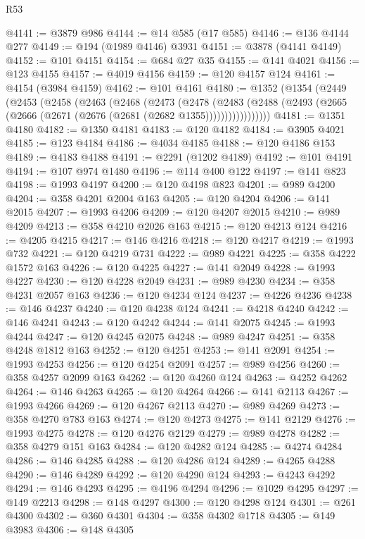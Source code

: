 \begin{lexlean}{R53}
\begin{coremodule}
@4141 := @3879 @986
@4144 := @14 @585 (@17 @585)
@4146 := @136 @4144 @277
@4149 := @194 (@1989 @4146) @3931
@4151 := @3878 (@4141 @4149)
@4152 := @101 @4151
@4154 := @684 @27 @35
@4155 := @141 @4021
@4156 := @123 @4155
@4157 := @4019 @4156
@4159 := @120 @4157 @124
@4161 := @4154 (@3984 @4159)
@4162 := @101 @4161
@4180 := @1352
    (@1354
      (@2449
        (@2453
          (@2458
            (@2463
              (@2468
                (@2473
                  (@2478
                    (@2483
                      (@2488 (@2493 (@2665 (@2666 (@2671 (@2676 (@2681 (@2682 @1355)))))))))))))))))
@4181 := @1351 @4180
@4182 := @1350 @4181
@4183 := @120 @4182
@4184 := @3905 @4021
@4185 := @123 @4184
@4186 := @4034 @4185
@4188 := @120 @4186 @153
@4189 := @4183 @4188
@4191 := @2291 (@1202 @4189)
@4192 := @101 @4191
@4194 := @107 @974 @1480
@4196 := @114 @400 @122
@4197 := @141 @823
@4198 := @1993 @4197
@4200 := @120 @4198 @823
@4201 := @989 @4200
@4204 := @358 @4201 @2004 @163
@4205 := @120 @4204
@4206 := @141 @2015
@4207 := @1993 @4206
@4209 := @120 @4207 @2015
@4210 := @989 @4209
@4213 := @358 @4210 @2026 @163
@4215 := @120 @4213 @124
@4216 := @4205 @4215
@4217 := @146 @4216
@4218 := @120 @4217
@4219 := @1993 @732
@4221 := @120 @4219 @731
@4222 := @989 @4221
@4225 := @358 @4222 @1572 @163
@4226 := @120 @4225
@4227 := @141 @2049
@4228 := @1993 @4227
@4230 := @120 @4228 @2049
@4231 := @989 @4230
@4234 := @358 @4231 @2057 @163
@4236 := @120 @4234 @124
@4237 := @4226 @4236
@4238 := @146 @4237
@4240 := @120 @4238 @124
@4241 := @4218 @4240
@4242 := @146 @4241
@4243 := @120 @4242
@4244 := @141 @2075
@4245 := @1993 @4244
@4247 := @120 @4245 @2075
@4248 := @989 @4247
@4251 := @358 @4248 @1812 @163
@4252 := @120 @4251
@4253 := @141 @2091
@4254 := @1993 @4253
@4256 := @120 @4254 @2091
@4257 := @989 @4256
@4260 := @358 @4257 @2099 @163
@4262 := @120 @4260 @124
@4263 := @4252 @4262
@4264 := @146 @4263
@4265 := @120 @4264
@4266 := @141 @2113
@4267 := @1993 @4266
@4269 := @120 @4267 @2113
@4270 := @989 @4269
@4273 := @358 @4270 @783 @163
@4274 := @120 @4273
@4275 := @141 @2129
@4276 := @1993 @4275
@4278 := @120 @4276 @2129
@4279 := @989 @4278
@4282 := @358 @4279 @151 @163
@4284 := @120 @4282 @124
@4285 := @4274 @4284
@4286 := @146 @4285
@4288 := @120 @4286 @124
@4289 := @4265 @4288
@4290 := @146 @4289
@4292 := @120 @4290 @124
@4293 := @4243 @4292
@4294 := @146 @4293
@4295 := @4196 @4294
@4296 := @1029 @4295
@4297 := @149 @2213
@4298 := @148 @4297
@4300 := @120 @4298 @124
@4301 := @261 @4300
@4302 := @360 @4301
@4304 := @358 @4302 @1718
@4305 := @149 @3983
@4306 := @148 @4305

\end{coremodule}
\end{lexlean}
